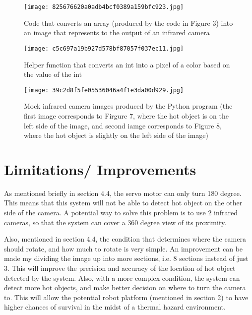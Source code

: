 \documentclass[12pt]{article}
\begin{document}
\begin{figure}[h]
\texttt{[image: 825676620a0adb4bcf0389a159bfc923.jpg]}
\centering
\caption{Code that converts an array (produced by the code in Figure 3) into an image that represents to the output of an infrared camera}
\end{figure}

\begin{figure}[h]
\texttt{[image: c5c697a19b927d578bf87057f037ec11.jpg]}
\centering
\caption{Helper function that converts an int into a pixel of a color based on the value of the int}
\end{figure}

\begin{figure}[h]
\texttt{[image: 39c2d8f5fe05536046a4f1e3da00d929.jpg]}
\centering
\caption{Mock infrared camera images produced by the Python program (the first image corresponds to Firgure 7, where the hot object is on the left side of the image, and second iamge corresponds to Figure 8, where the hot object is slightly on the left side of the image)}
\end{figure}

\section {Limitations/ Improvements}
As mentioned briefly in section 4.4, the servo motor can only turn 180 degree. This means that this system will not be able to detect hot object on the other side of the camera. A potential way to solve this problem is to use 2 infrared cameras, so that the system can cover a 360 degree view of its proximity.

Also, mentioned in section 4.4, the condition that determines where the camera should rotate, and how much to rotate is very simple. An improvement can be made my dividing the image up into more sections, i.e. 8 sections instead of just 3. This will improve the precision and accuracy of the location of hot object detected by the system. Also, with a more complex condition, the system can detect more hot objects, and make better decision on where to turn the camera to. This will allow the potential robot platform (mentioned in section 2) to have higher chances of survival in the midst of a thermal hazard environment.

\end{document}
